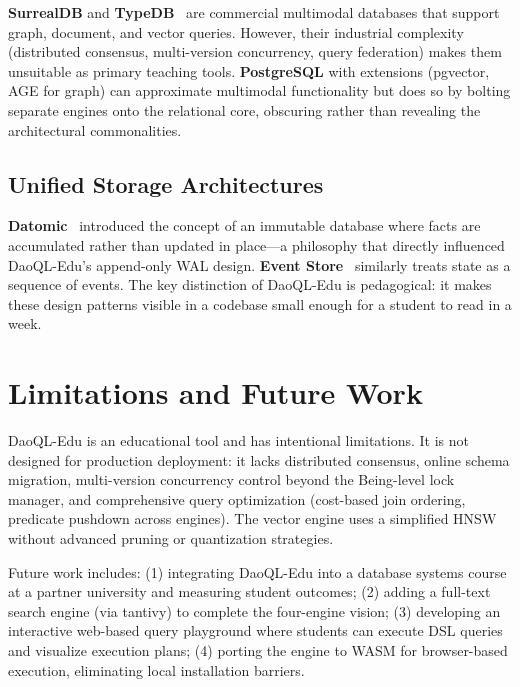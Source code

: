 \documentclass[11pt,a4paper]{article}
\begin{document}
\textbf{SurrealDB} and \textbf{TypeDB}~\cite{ioannou2023} are commercial
multimodal databases that support graph, document, and vector queries.
However, their industrial complexity (distributed consensus, multi-version
concurrency, query federation) makes them unsuitable as primary teaching
tools. \textbf{PostgreSQL} with extensions (pgvector, AGE for graph) can
approximate multimodal functionality but does so by bolting separate engines
onto the relational core, obscuring rather than revealing the architectural
commonalities.

\subsection{Unified Storage Architectures}

\textbf{Datomic}~\cite{hickey2012} introduced the concept of an immutable
database where facts are accumulated rather than updated in place---a
philosophy that directly influenced DaoQL-Edu's append-only WAL design.
\textbf{Event Store}~\cite{young2011} similarly treats state as a sequence
of events. The key distinction of DaoQL-Edu is pedagogical: it makes these
design patterns visible in a codebase small enough for a student to read
in a week.

\section{Limitations and Future Work}

DaoQL-Edu is an educational tool and has intentional limitations. It is
not designed for production deployment: it lacks distributed consensus,
online schema migration, multi-version concurrency control beyond the
Being-level lock manager, and comprehensive query optimization (cost-based
join ordering, predicate pushdown across engines). The vector engine uses a
simplified HNSW without advanced pruning or quantization strategies.

Future work includes: (1) integrating DaoQL-Edu into a database systems
course at a partner university and measuring student outcomes; (2) adding
a full-text search engine (via tantivy) to complete the four-engine vision;
(3) developing an interactive web-based query playground where students can
execute DSL queries and visualize execution plans; (4) porting the engine to
WASM for browser-based execution, eliminating local installation barriers.
\end{document}
